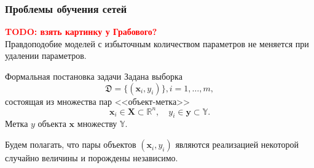 \documentclass[usenames,dvipsnames,11pt,pdf,utf8,russian,aspectratio=169]{beamer}
\begin{document}
\begin{frame}                                                                                                                                   
\frametitle{Проблемы обучения сетей}   
\textcolor{red}{\textbf{TODO: взять картинку у Грабового?\\}}                                                                                                         
Правдоподобие моделей с избыточным количеством параметров не меняется при удалении параметров.                                                       
\begin{figure}[h]                                                                                                                               
\centering                                                                                                                                      
\end{figure}                                                                                                                                    
                                                                                                                                                
\end{frame}    



\begin{frame}{Формальная постановка задачи}
Задана выборка 
\[
\mathfrak{D} = \{(\mathbf{x}_i,y_i)\}, i = 1,\dots,m,
\] 
состоящая из множества пар <<объект-метка>> $$\mathbf{x}_i \in \mathbf{X} \subset \mathbb{R}^n, \quad {y}_i \in \mathbf{y} \subset \mathbb{Y}.$$
Метка ${y}$  объекта $\mathbf{x}$ множеству $\mathbb{Y}.$

Будем полагать, что пары объектов $(\mathbf{x}_i, y_i)$ являются реализацией некоторой случайно величины и порождены независимо.
\end{frame}
\end{document}
